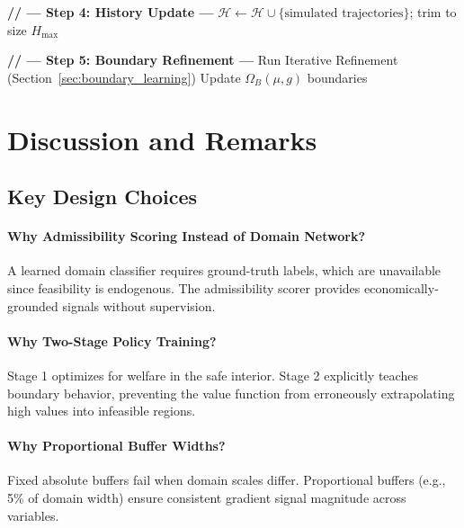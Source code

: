 \begin{algorithm}[H]
\begin{algorithmic}[1]
    \State
    \State \textbf{// --- Step 4: History Update ---}
    \State $\mathcal{H} \gets \mathcal{H} \cup \{\text{simulated trajectories}\}$; trim to size $H_{\max}$
    
    \State
    \State \textbf{// --- Step 5: Boundary Refinement ---}
        \State Run Iterative Refinement (Section~\ref{sec:boundary_learning})
        \State Update $\Omega_B(\mu, g)$ boundaries
    \EndIf
\EndFor
\end{algorithmic}
\end{algorithm}


\section{Discussion and Remarks}

\subsection{Key Design Choices}

\paragraph{Why Admissibility Scoring Instead of Domain Network?}
A learned domain classifier requires ground-truth labels, which are unavailable since feasibility is endogenous. The admissibility scorer provides economically-grounded signals without supervision.

\paragraph{Why Two-Stage Policy Training?}
Stage 1 optimizes for welfare in the safe interior. Stage 2 explicitly teaches boundary behavior, preventing the value function from erroneously extrapolating high values into infeasible regions.

\paragraph{Why Proportional Buffer Widths?}
Fixed absolute buffers fail when domain scales differ. Proportional buffers (e.g., 5\% of domain width) ensure consistent gradient signal magnitude across variables.

